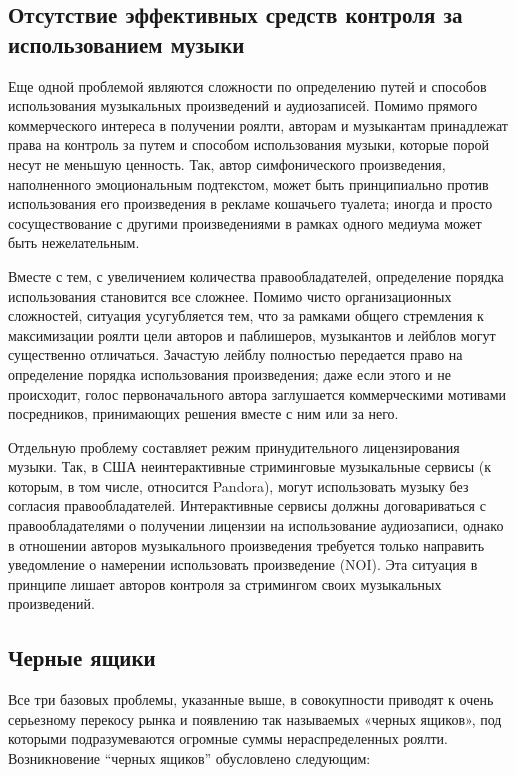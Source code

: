 \documentclass[12pt]{report}
\begin{document}
\begin{multicols}{2}
\subsection{Отсутствие эффективных средств контроля за использованием музыки}

Еще одной проблемой являются сложности по определению путей и способов использования музыкальных произведений и аудиозаписей. Помимо прямого коммерческого интереса в получении роялти, авторам и музыкантам принадлежат права на контроль за путем и способом использования музыки, которые порой несут не меньшую ценность. Так, автор симфонического произведения, наполненного эмоциональным подтекстом, может быть принципиально против использования его произведения в рекламе кошачьего туалета; иногда и просто сосуществование с другими произведениями в рамках одного медиума может быть нежелательным.

Вместе с тем, с увеличением количества правообладателей, определение порядка использования становится все сложнее. Помимо чисто организационных сложностей, ситуация усугубляется тем, что за рамками общего стремления к максимизации роялти цели авторов и паблишеров, музыкантов и лейблов могут существенно отличаться. Зачастую лейблу полностью передается право на определение порядка использования произведения; даже если этого и не происходит, голос первоначального автора заглушается коммерческими мотивами посредников, принимающих решения вместе с ним или за него.

Отдельную проблему составляет режим принудительного лицензирования музыки. Так, в США неинтерактивные стриминговые музыкальные сервисы (к которым, в том числе, относится Pandora), могут использовать музыку без согласия правообладателей. Интерактивные сервисы должны договариваться с правообладателями о получении лицензии на использование аудиозаписи, однако в отношении авторов музыкального произведения требуется только направить уведомление о намерении использовать произведение (NOI). Эта ситуация в принципе лишает авторов контроля за стримингом своих музыкальных произведений.

\subsection{Черные ящики}

Все три базовых проблемы, указанные выше, в совокупности приводят к очень серьезному перекосу рынка и появлению так называемых «черных ящиков», под которыми подразумеваются огромные суммы нераспределенных роялти.
Возникновение “черных ящиков” обусловлено следующим:


\end{multicols}
\end{document}
